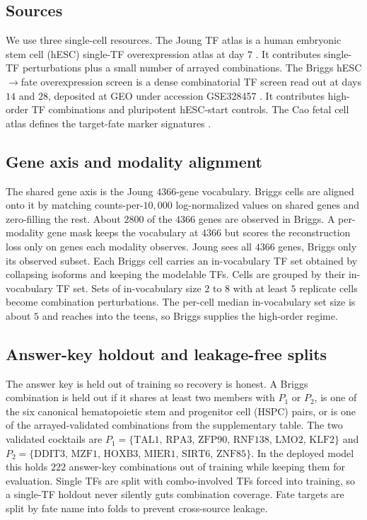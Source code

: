 \subsection{Sources}
We use three single-cell resources. The Joung TF atlas is a human embryonic stem cell
(hESC) single-TF overexpression atlas at day $7$ \citep{joung2023tfatlas}. It contributes
single-TF perturbations plus a small number of arrayed combinations. The Briggs
hESC$\to$fate overexpression screen is a dense combinatorial TF screen read out at days
$14$ and $28$, deposited at GEO under accession GSE328457 \citep{briggs2026}. It
contributes high-order TF combinations and pluripotent hESC-start controls. The Cao fetal
cell atlas defines the target-fate marker signatures \citep{cao2020fetal}.

\subsection{Gene axis and modality alignment}
The shared gene axis is the Joung $4366$-gene vocabulary. Briggs cells are aligned onto it
by matching counts-per-$10{,}000$ log-normalized values on shared genes and zero-filling
the rest. About $2800$ of the $4366$ genes are observed in Briggs. A per-modality gene mask
keeps the vocabulary at $4366$ but scores the reconstruction loss only on genes each
modality observes. Joung sees all $4366$ genes, Briggs only its observed subset. Each
Briggs cell carries an in-vocabulary TF set obtained by collapsing isoforms and keeping the
modelable TFs. Cells are grouped by their in-vocabulary TF set. Sets of in-vocabulary size
$2$ to $8$ with at least $5$ replicate cells become combination
perturbations. The per-cell median in-vocabulary set size is about $5$ and reaches into the
teens, so Briggs supplies the high-order regime.

\subsection{Answer-key holdout and leakage-free splits}
The answer key is held out of training so recovery is honest. A Briggs combination is held
out if it shares at least two members with $P_1$ or $P_2$, is one of the six canonical hematopoietic stem and progenitor cell (HSPC)
pairs, or is one of the arrayed-validated combinations from the supplementary table. The
two validated cocktails are
$P_1=\{\text{TAL1, RPA3, ZFP90, RNF138, LMO2, KLF2}\}$ and
$P_2=\{\text{DDIT3, MZF1, HOXB3, MIER1, SIRT6, ZNF85}\}$. In the deployed
model this holds $222$ answer-key combinations out of training while keeping them for
evaluation. Single TFs are
split with combo-involved TFs forced into training, so a single-TF holdout never silently
guts combination coverage.
Fate targets are split by fate name into folds to prevent cross-source leakage.

